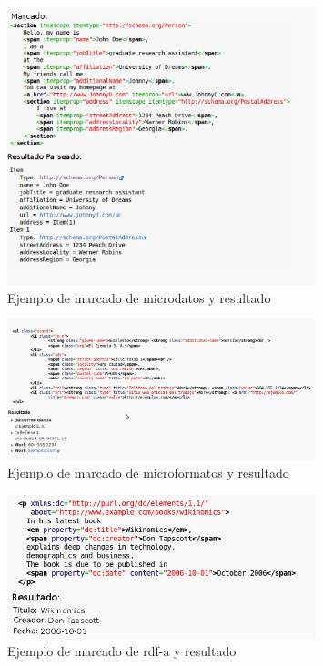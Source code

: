 \begin{figure}
    \centering
    \includegraphics[width=0.8\textwidth,natwidth=610,natheight=642]{microdata}
    \caption{Ejemplo de marcado de microdatos y resultado}
\end{figure}
\begin{figure}
    \centering
    \includegraphics[width=0.8\textwidth,natwidth=610,natheight=642]{microformats}
    \caption{Ejemplo de marcado de microformatos y resultado}
\end{figure}
\begin{figure}
    \centering
    \includegraphics[width=0.8\textwidth,natwidth=610,natheight=642]{rdfa}
    \caption{Ejemplo de marcado de rdf-a y resultado}
\end{figure}


